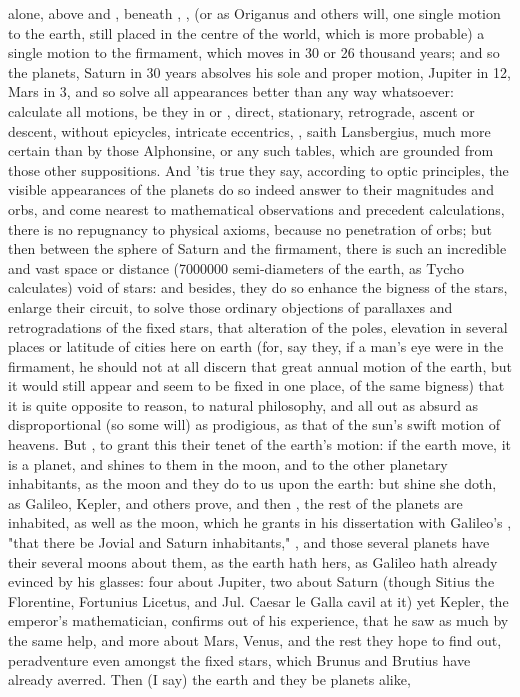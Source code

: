 {alone, above  and , beneath , ,  (or as Origanus and others will, one single motion to the earth, still placed in the centre of the world, which is more probable) a single motion to the firmament, which moves in 30 or 26 thousand years; and so the planets, Saturn in 30 years absolves his sole and proper motion, Jupiter in 12, Mars in 3, \etc{} and so solve all appearances better than any way whatsoever: calculate all motions, be they in  or , direct, stationary, retrograde, ascent or descent, without epicycles, intricate eccentrics, \etc{} , saith Lansbergius, much more certain than by those Alphonsine, or any such tables, which are grounded from those other suppositions. And 'tis true they say, according to optic principles, the visible appearances of the planets do so indeed answer to their magnitudes and orbs, and come nearest to mathematical observations and precedent calculations, there is no repugnancy to physical axioms, because no penetration of orbs; but then between the sphere of Saturn and the firmament, there is such an incredible and vast space or distance (7\thinspace{}000\thinspace{}000 semi-diameters of the earth, as Tycho calculates) void of stars: and besides, they do so enhance the bigness of the stars, enlarge their circuit, to solve those ordinary objections of parallaxes and retrogradations of the fixed stars, that alteration of the poles, elevation in several places or latitude of cities here on earth (for, say they, if a man's eye were in the firmament, he should not at all discern that great annual motion of the earth, but it would still appear  and seem to be fixed in one place, of the same bigness) that it is quite opposite to reason, to natural philosophy, and all out as absurd as disproportional (so some will) as prodigious, as that of the sun's swift motion of heavens. But , to grant this their tenet of the earth's motion: if the earth move, it is a planet, and shines to them in the moon, and to the other planetary inhabitants, as the moon and they do to us upon the earth: but shine she doth, as Galileo, Kepler, and others prove, and then , the rest of the planets are inhabited, as well as the moon, which he grants in his dissertation with Galileo's , "that there be Jovial and Saturn inhabitants," \etc{}, and those several planets have their several moons about them, as the earth hath hers, as Galileo hath already evinced by his glasses: four about Jupiter, two about Saturn (though Sitius the Florentine, Fortunius Licetus, and Jul. Caesar le Galla cavil at it) yet Kepler, the emperor's mathematician, confirms out of his experience, that he saw as much by the same help, and more about Mars, Venus, and the rest they hope to find out, peradventure even amongst the fixed stars, which Brunus and Brutius have already averred. Then (I say) the earth and they be planets alike, }
